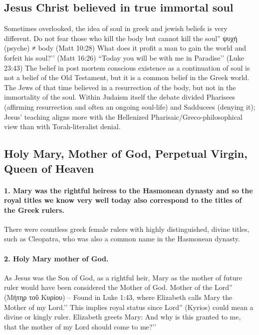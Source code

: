 \subsection{Jesus Christ believed in true immortal soul}\label{subsec:jesus-christ-believed-in-true-immortal-soul}
Sometimes overlooked, the idea of soul in greek and jewish beliefs is very different.
Do not fear those who kill the body but cannot kill the soul'' ψυχή (psyche) ≠ body (Matt 10:28) What does it profit a man to gain the world and forfeit his soul?’’ (Matt 16:26) ``Today you will be with me in Paradise’’ (Luke 23:43)
The belief in post mortem conscious existence as a continuation of soul is not a belief of the Old Testament, but it is a common belief in the Greek world.
The Jews of that time believed in a resurrection of the body, but not in the immortality of the soul. Within Judaism itself the debate divided Pharisees (affirming resurrection and often an ongoing soul-life) and Sadducees (denying it); Jesus’ teaching aligns more with the Hellenized Pharisaic/Greco-philosophical view than with Torah-literalist denial.

\subsection{Holy Mary, Mother of God, Perpetual Virgin, Queen of Heaven}\label{subsec:holy-mary-mother-of-god-perpetual-virgin-queen-of-heaven}
\paragraph{1.
Mary was the rightful heiress to the Hasmonean dynasty and so the royal titles we know very well today also correspond to the titles of the Greek rulers.}\label{par:mary-was-the-rightful-heiress-to-the-hasmonean-dynasty-and-so-the-royal-titles-we-know-very-well-today-also-correspond-to-the-titles-of-the-greek-rulers.}
There were countless greek female rulers with highly distinguished, divine titles, such as Cleopatra, who was also a common name in the Hasmonean dynasty.
\paragraph{2.
Holy Mary mother of God.}\label{par:holy-mary-mother-of-god.}
As Jesus was the Son of God, as a rightful heir, Mary as the mother of future ruler would have been considered the Mother of God.
Mother of the Lord'' (Μήτηρ τοῦ Κυρίου) -- Found in Luke 1:43, where Elizabeth calls Mary the Mother of my Lord.’’ This implies royal status since Lord'' (Kyrios) could mean a divine or kingly ruler. Elizabeth greets Mary: And why is this granted to me, that the mother of my Lord should come to me?’’
